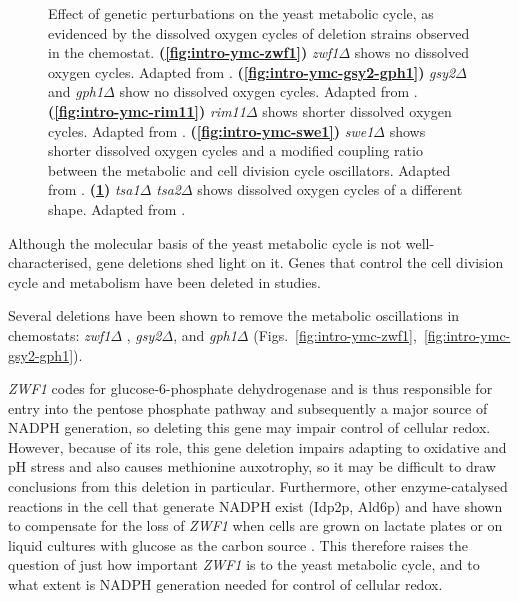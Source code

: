 \begin{figure}
\begin{subfigure}[htpb]{0.4\textwidth}
   \caption{
   }
   \label{fig:intro-ymc-tsa1-tsa2}
  \end{subfigure}
  \caption[
    Effect of genetic perturbations on the yeast metabolic cycle
  ]{
    Effect of genetic perturbations on the yeast metabolic cycle, as evidenced by the dissolved oxygen cycles of deletion strains observed in the chemostat.
    \textbf{(\ref{fig:intro-ymc-zwf1})}
    \textit{zwf1$\Delta$} shows no dissolved oxygen cycles.
    Adapted from \textcite{tuCyclicChangesMetabolic2007}.
    \textbf{(\ref{fig:intro-ymc-gsy2-gph1})}
    \textit{gsy2$\Delta$} and \textit{gph1$\Delta$} show no dissolved oxygen cycles.
    Adapted from \textcite{oneillEukaryoticCellBiology2020}.
    \textbf{(\ref{fig:intro-ymc-rim11})}
    \textit{rim11$\Delta$} shows shorter dissolved oxygen cycles.
    Adapted from \textcite{caustonMetabolicCyclesYeast2015}.
    \textbf{(\ref{fig:intro-ymc-swe1})}
    \textit{swe1$\Delta$} shows shorter dissolved oxygen cycles and a modified coupling ratio between the metabolic and cell division cycle oscillators.
    Adapted from \textcite{caustonMetabolicCyclesYeast2015}.
    \textbf{(\ref{fig:intro-ymc-tsa1-tsa2})}
    \textit{tsa1$\Delta$ tsa2$\Delta$} shows dissolved oxygen cycles of a different shape.
    Adapted from \textcite{caustonMetabolicCyclesYeast2015}.
  }
  \label{fig:intro-ymc-del}
\end{figure}

Although the molecular basis of the yeast metabolic cycle is not well-characterised, gene deletions shed light on it.
Genes that control the cell division cycle and metabolism have been deleted in studies.

Several deletions have been shown to remove the metabolic oscillations in chemostats: \textit{zwf1$\Delta$} \parencite{tuCyclicChangesMetabolic2007}, \textit{gsy2$\Delta$}, and \textit{gph1$\Delta$} \parencite{oneillEukaryoticCellBiology2020} (Figs.\ \ref{fig:intro-ymc-zwf1},~\ref{fig:intro-ymc-gsy2-gph1}).

\textit{ZWF1} codes for glucose-6-phosphate dehydrogenase and is thus responsible for entry into the pentose phosphate pathway and subsequently a major source of NADPH generation, so deleting this gene may impair control of cellular redox.
However, because of its role, this gene deletion impairs adapting to oxidative and pH stress and also causes methionine auxotrophy, so it may be difficult to draw conclusions from this deletion in particular.
Furthermore, other enzyme-catalysed reactions in the cell that generate NADPH exist (Idp2p, Ald6p) and have shown to compensate for the loss of \textit{ZWF1} when cells are grown on lactate plates or on liquid cultures with glucose as the carbon source \parencite{minardSourcesNADPHYeast2005}.
This therefore raises the question of just how important \textit{ZWF1} is to the yeast metabolic cycle, and to what extent is NADPH generation needed for control of cellular redox.

